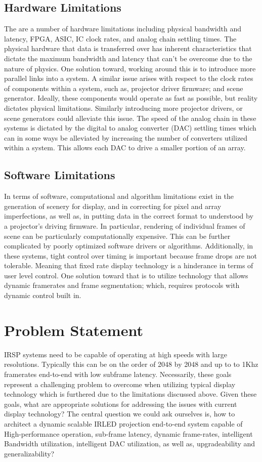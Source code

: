 \subsection{Hardware Limitations}
    The are a number of hardware limitations including physical bandwidth and latency, FPGA, ASIC, IC clock rates, and analog chain settling times. The physical hardware that data is transferred over has inherent characteristics that dictate the maximum bandwidth and latency that can't be overcome due to the nature of physics. One solution toward, working around this is to introduce more parallel links into a system. A similar issue arises with respect to the clock rates of components within a system, such as, projector driver firmware; and scene generator. Ideally, these components would operate as fast as possible, but reality dictates physical limitations. Similarly introducing more projector drivers, or scene generators could alleviate this issue. The speed of the analog chain in these systems is dictated by the digital to analog converter (DAC) settling times which can in some ways be alleviated by increasing the number of converters utilized within a system. This allows each DAC to drive a smaller portion of an array.

\subsection{Software Limitations}
    In terms of software, computational and algorithm limitations exist in the generation of scenery for display, and in correcting for pixel and array imperfections, as well as, in putting data in the correct format to understood by a projector's driving firmware. In particular, rendering of individual frames of scene can be particularly computationally expensive. This can be further complicated by poorly optimized software drivers or algorithms. Additionally, in these systems, tight control over timing is important because frame drops are not tolerable. Meaning that fixed rate display technology is a hinderance in terms of user level control. One solution toward that is to utilize technology that allows dynamic framerates and frame segmentation; which, requires protocols with dynamic control built in.


\section{Problem Statement}
IRSP systems need to be capable of operating at high speeds with large resolutions. Typically this can be on the order of 2048 by 2048 and up to to 1Khz framerates end-to-end with low subframe latency. Necessarily, these goals represent a challenging problem to overcome when utilizing typical display technology which is furthered due to the limitations discussed above. Given these goals, what are appropriate solutions for addressing the issues with current display technology? The central question we could ask ourselves is, how to architect a dynamic scalable IRLED projection end-to-end system capable of High-performance operation, sub-frame latency, dynamic frame-rates, intelligent Bandwidth utilization, intelligent DAC utilization, as well as, upgradeability and generalizability?

